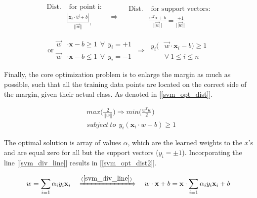 	\begin{equation}
		\begin{aligned}
			\text{Dist.}&\text{ for point i}: \\ 
			&\frac{| \textbf{x}_i \cdot \vec{w} + b|}{||\vec{w}||},
		\end{aligned}
		\ \ \ \Rightarrow 	\ \ \ \ 
		\begin{aligned}
			\text{Dist.}&\text{ for support vectors:} \\
			&\frac{w^T\textbf{x} + b}{||\vec{w}||} = \frac{\pm 1}{||\vec{w}||}
		\end{aligned}
		\label{svm_dist}
	\end{equation}
	
	\begin{equation}
		\text{or}
		\begin{aligned}
			\vec{w}& \cdot \textbf{x} - b \geq 1 \ \ \forall \ \  y_i = +1 \\
			\vec{w}& \cdot \textbf{x} - b \leq 1 \ \ \forall \ \  y_i = -1
			\end{aligned}	
			\ \Rightarrow \ 
			\begin{aligned}
			y_i(&\vec{w} \cdot \textbf{x}_i - b) \geq 1 \\
			&\forall \ 1 \leq i \leq n
		\end{aligned}
		\label{svm_constaints}
	\end{equation}
	
	Finally, the core optimization problem is to enlarge the margin as much as possible, such that all the training data points are located on the correct side of the margin, given their actual class. As denoted in [\ref{svm_opt_dist}].
	
	\begin{equation}
		\begin{aligned}
			&max \Bigg(\frac{2}{||w||}\Bigg) \Rightarrow 
			min \Bigg( \frac{w^Tw}{2}	\Bigg)\\
			&subject \  to \ \ y_i(\textbf{x}_i \cdot w + b) \geq 1
		\end{aligned}
		\label{svm_opt_dist}
	\end{equation}
	
	The optimal solution is array of values $\alpha$, which are the learned weights to the $x$'s and are equal zero for all but the support vectors ($y_i = \pm1 $). Incorporating the line [\ref{svm_div_line}] results in [\ref{svm_opt_dist2}].
	
	\begin{equation}
		w = \sum_{i=1}\alpha_i y_i \textbf{x}_i \ \ \ \xRightarrow[]{(\ref{svm_div_line})}
		\ \ \ w \cdot \textbf{x} + b = \textbf{x} \cdot  \sum_{i=1} \alpha_i y_i \textbf{x}_i  + b
		\label{svm_opt_dist2}
	\end{equation}
	
